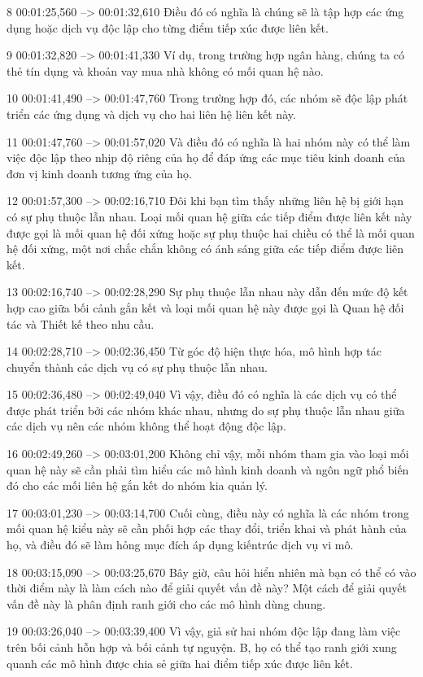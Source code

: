 8
00:01:25,560 --> 00:01:32,610
Điều đó có nghĩa là chúng sẽ là tập hợp các ứng dụng hoặc dịch vụ độc lập cho từng điểm tiếp xúc được liên kết.

9
00:01:32,820 --> 00:01:41,330
Ví dụ, trong trường hợp ngân hàng, chúng ta có thẻ tín dụng và khoản vay mua nhà không có mối quan hệ nào.

10
00:01:41,490 --> 00:01:47,760
Trong trường hợp đó, các nhóm sẽ độc lập phát triển các ứng dụng và dịch vụ cho hai liên hệ liên kết này.

11
00:01:47,760 --> 00:01:57,020
Và điều đó có nghĩa là hai nhóm này có thể làm việc độc lập theo nhịp độ riêng của họ để đáp ứng các mục tiêu kinh doanh của đơn vị kinh doanh tương ứng của họ.

12
00:01:57,300 --> 00:02:16,710
Đôi khi bạn tìm thấy những liên hệ bị giới hạn có sự phụ thuộc lẫn nhau.  Loại mối quan hệ giữa các tiếp điểm được liên kết này được gọi là mối quan hệ đối xứng hoặc sự phụ thuộc hai chiều có thể là mối quan hệ đối xứng, một nơi chắc chắn không có ánh sáng giữa các tiếp điểm được liên kết.

13
00:02:16,740 --> 00:02:28,290
Sự phụ thuộc lẫn nhau này dẫn đến mức độ kết hợp cao giữa bối cảnh gắn kết và loại mối quan hệ này được gọi là Quan hệ đối tác và Thiết kế theo nhu cầu.

14
00:02:28,710 --> 00:02:36,450
Từ góc độ hiện thực hóa, mô hình hợp tác chuyển thành các dịch vụ có sự phụ thuộc lẫn nhau.

15
00:02:36,480 --> 00:02:49,040
Vì vậy, điều đó có nghĩa là các dịch vụ có thể được phát triển bởi các nhóm khác nhau, nhưng do sự phụ thuộc lẫn nhau giữa các dịch vụ nên các nhóm không thể hoạt động độc lập.

16
00:02:49,260 --> 00:03:01,200
Không chỉ vậy, mỗi nhóm tham gia vào loại mối quan hệ này sẽ cần phải tìm hiểu các mô hình kinh doanh và ngôn ngữ phổ biến đó cho các mối liên hệ gắn kết do nhóm kia quản lý.

17
00:03:01,230 --> 00:03:14,700
Cuối cùng, điều này có nghĩa là các nhóm trong mối quan hệ kiểu này sẽ cần phối hợp các thay đổi, triển khai và phát hành của họ, và điều đó sẽ làm hỏng mục đích áp dụng kiến ​​trúc dịch vụ vi mô.

18
00:03:15,090 --> 00:03:25,670
Bây giờ, câu hỏi hiển nhiên mà bạn có thể có vào thời điểm này là làm cách nào để giải quyết vấn đề này?  Một cách để giải quyết vấn đề này là phân định ranh giới cho các mô hình dùng chung.

19
00:03:26,040 --> 00:03:39,400
Vì vậy, giả sử hai nhóm độc lập đang làm việc trên bối cảnh hỗn hợp và bối cảnh tự nguyện.  B, họ có thể tạo ranh giới xung quanh các mô hình được chia sẻ giữa hai điểm tiếp xúc được liên kết.

